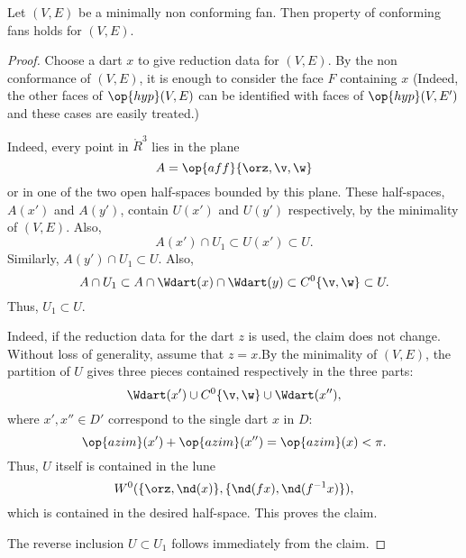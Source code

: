 \begin{lemma}[] Let $(V,E)$ be a minimally non
conforming fan.  Then property  of conforming fans
holds for $(V,E)$.
\end{lemma}
%

\begin{proof}
  Choose a dart $x$ to give reduction data for $(V,E)$.  By the non
  conformance of $(V,E)$, it is enough to consider the face $F$
  containing $x$ (Indeed, the other faces of $\op{hyp}(V,E)$ can be
  identified with faces of $\op{hyp}(V,E')$ and these cases are easily
  treated.)  

Indeed,  every
  point in $\ring{R}^3$ lies in the plane
\begin{displaymath}
A=\op{aff}\{\orz,\v,\w\}
\end{displaymath}
or in one of the two open half-spaces bounded by this plane.  These
half-spaces, $A(x')$ and $A(y')$, contain $U(x')$ and $U(y')$
respectively, by the minimality of $(V,E)$.  Also,
\begin{displaymath}
A(x')\cap U_1 \subset U(x')\subset U.
\end{displaymath}
Similarly, $A(y')\cap U_1 \subset U$.  Also,
\begin{displaymath}
A \cap U_1 \subset A \cap \Wdart(x) \cap \Wdart(y) \subset C^0\{\v,\w\} \subset U.
\end{displaymath}
Thus,
$U_1\subset U$.

 Indeed,
if the reduction data for the dart $z$ is used, the claim does not change.
Without loss of generality, assume that $z=x$.By the minimality of $(V,E)$, the
partition  of $U$ gives three pieces contained respectively
in the three parts:
\begin{displaymath}
\Wdart(x') \cup C^0\{\v,\w\} \cup \Wdart(x''),
\end{displaymath}
where $x',x''\in D'$ correspond to the single dart $x$ in $D$:
\begin{displaymath}
\op{azim}(x') + \op{azim}(x'') = \op{azim}(x) < \pi.
\end{displaymath}
Thus, $U$ itself is contained in the lune
\begin{displaymath}
W^0(\{\orz,\nd(x)\},\{\nd(f x),\nd(f^{-1} x)\}),
\end{displaymath}
which is contained in the desired half-space.  This proves the claim.

The reverse inclusion $U\subset U_1$ follows immediately from the claim.
\end{proof}

